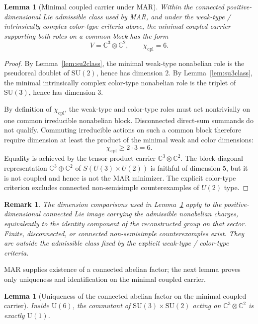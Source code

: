 \documentclass[11pt]{article}
\newtheorem{lemma}[theorem]{Lemma}
\newtheorem{remark}[theorem]{Remark}
\newcommand{\SU}{\mathrm{SU}}
\newcommand{\U}{\mathrm{U}}
\begin{document}
\begin{lemma}[Minimal coupled carrier under MAR]\label{lem:carrier}
Within the connected positive-dimensional Lie admissible class used by MAR, and under the weak-type / intrinsically complex color-type criteria above, the minimal coupled carrier supporting both roles on a common block has the form
\[
V=\mathbb C^3\otimes \mathbb C^2,
\qquad
\chi_{\mathrm{cpl}}=6.
\]
\end{lemma}

\begin{proof}
By Lemma~\ref{lem:su2class}, the minimal weak-type nonabelian role is the pseudoreal doublet of $\SU(2)$, hence has dimension $2$. By Lemma~\ref{lem:su3class}, the minimal intrinsically complex color-type nonabelian role is the triplet of $\SU(3)$, hence has dimension $3$.

By definition of $\chi_{\mathrm{cpl}}$, the weak-type and color-type roles must act nontrivially on one common irreducible nonabelian block. Disconnected direct-sum summands do not qualify. Commuting irreducible actions on such a common block therefore require dimension at least the product of the minimal weak and color dimensions:
\[
\chi_{\mathrm{cpl}}\ge 2\cdot 3=6.
\]
Equality is achieved by the tensor-product carrier $\mathbb C^3\otimes\mathbb C^2$. The block-diagonal representation $\mathbb C^3\oplus \mathbb C^2$ of $S(U(3)\times U(2))$ is faithful of dimension $5$, but it is not coupled and hence is not the MAR minimizer. The explicit color-type criterion excludes connected non-semisimple counterexamples of $U(2)$ type.
\end{proof}

\begin{remark}\label{rem:connectedlie}
The dimension comparisons used in Lemma~\ref{lem:carrier} apply to the positive-dimensional connected Lie image carrying the admissible nonabelian charges, equivalently to the identity component of the reconstructed group on that sector. Finite, disconnected, or connected non-semisimple counterexamples exist. They are outside the admissible class fixed by the explicit weak-type / color-type criteria.
\end{remark}

MAR supplies existence of a connected abelian factor; the next lemma proves only uniqueness and identification on the minimal coupled carrier.

\begin{lemma}[Uniqueness of the connected abelian factor on the minimal coupled carrier]\label{lem:commutant}
Inside $\U(6)$, the commutant of $\SU(3)\times\SU(2)$ acting on $\mathbb C^3\otimes \mathbb C^2$ is exactly $\U(1)$.
\end{lemma}
\end{document}
